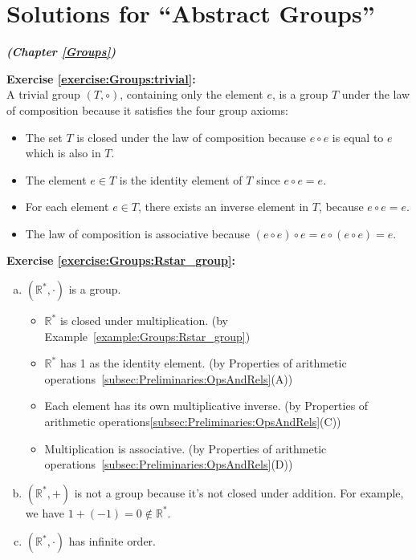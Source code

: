 
\section{Solutions for  ``Abstract Groups''}
\noindent\textbf{\textit{ (Chapter \ref{Groups})}}\bigskip

\noindent\textbf{Exercise \ref{exercise:Groups:trivial}:}
\\
A trivial group $(T, \circ )$, containing only the element $e$, is a group $T$ under the law of composition because it satisfies the four group axioms: 

\begin{itemize}
\item
The set $T$ is closed under the law of composition because $e \circ e $ is equal to $e$ which is also in $T$.

\item
The element $e \in T$ is the identity element of $T$ since $e \circ e = e$.

\item
For each element $e \in T$, there exists an inverse element in $T$, because $e \circ e = e$.

\item
The law of composition is associative because $(e \circ e) \circ e = e \circ (e \circ e) = e$.
\end{itemize}
\medskip

\noindent\textbf{Exercise \ref{exercise:Groups:Rstar_group}:}
\begin{enumerate}[(a)]
\item
$({\mathbb R}^{\ast}, \cdot)$ is a group.
\begin{itemize}
	\item
	${\mathbb R}^{\ast}$ is closed under multiplication. (by Example~\ref{example:Groups:Rstar_group}) 

	\item
	${\mathbb R}^{\ast}$ has 1 as the identity element. (by Properties of arithmetic operations~\ref{subsec:Preliminaries:OpsAndRels}(A))

	\item
	Each element has its own multiplicative inverse. (by  Properties of arithmetic operations\ref{subsec:Preliminaries:OpsAndRels}(C))

	\item
	Multiplication is associative. (by Properties of arithmetic operations~\ref{subsec:Preliminaries:OpsAndRels}(D))
	\end{itemize}
	
\item
$({\mathbb R}^{\ast}, +)$ is not a group because it's not closed under addition. For example, we have $1 + (-1) = 0 \not\in {\mathbb R}^{\ast}$.

\item
$({\mathbb R}^{\ast}, \cdot)$ has infinite order.
\end{enumerate}

